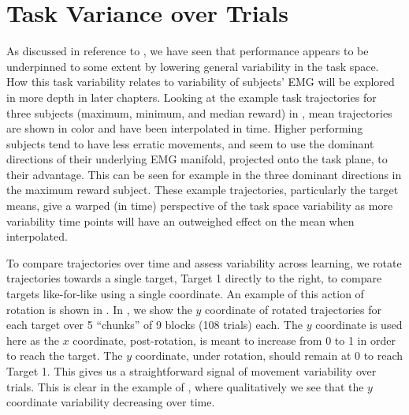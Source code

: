 \documentclass[../main.tex]{subfiles}
\begin{document}


\section{Task Variance over Trials}

As discussed in reference to , we have seen that performance appears to be underpinned to some extent by lowering general variability in the task space. How this task variability relates to variability of subjects' EMG will be explored in more depth in later chapters. Looking at the example task trajectories for three subjects (maximum, minimum, and median reward) in , mean trajectories are shown in color and have been interpolated in time. Higher performing subjects tend to have less erratic movements, and seem to use the dominant directions of their underlying EMG manifold, projected onto the task plane, to their advantage. This can be seen for example in the three dominant directions in the maximum reward subject. These example trajectories, particularly the target means, give a warped (in time) perspective of the task space variability as more variability time points will have an outweighed effect on the mean when interpolated.

To compare trajectories over time and assess variability across learning, we rotate trajectories towards a single target, Target 1 directly to the right, to compare targets like-for-like using a single coordinate. An example of this action of rotation is shown in . In , we show the $y$ coordinate of rotated trajectories for each target over 5 ``chunks'' of 9 blocks (108 trials) each. The $y$ coordinate is used here as the $x$ coordinate, post-rotation, is meant to increase from 0 to 1 in order to reach the target. The $y$ coordinate, under rotation, should remain at 0 to reach Target 1. This gives us a straightforward signal of movement variability over trials. This is clear in the example of , where qualitatively we see that the $y$ coordinate variability decreasing over time.
\end{document}
